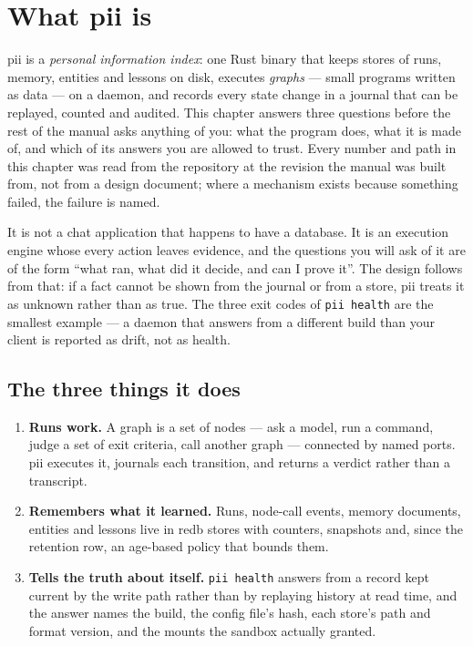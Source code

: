 \chapter{What pii is}

\label{ch:what}

pii is a \emph{personal information index}: one Rust binary that keeps stores of runs,
memory, entities and lessons on disk, executes \emph{graphs} --- small programs written as
data --- on a daemon, and records every state change in a journal that can be replayed,
counted and audited. This chapter answers three questions before the rest of the manual
asks anything of you: what the program does, what it is made of, and which of its answers
you are allowed to trust. Every number and path in this chapter was read from the
repository at the revision the manual was built from, not from a design document; where a
mechanism exists because something failed, the failure is named.

It is not a chat application that happens to have a database. It is an execution engine
whose every action leaves evidence, and the questions you will ask of it are of the form
\enquote{what ran, what did it decide, and can I prove it}. The design follows from that:
if a fact cannot be shown from the journal or from a store, pii treats it as unknown rather
than as true. The three exit codes of \texttt{pii health} are the smallest example --- a
daemon that answers from a different build than your client is reported as drift, not as
health.

\section{The three things it does}

\begin{enumerate}
	\item \textbf{Runs work.} A graph is a set of nodes --- ask a model, run a command,
	judge a set of exit criteria, call another graph --- connected by named ports. pii
	executes it, journals each transition, and returns a verdict rather than a transcript.
	\item \textbf{Remembers what it learned.} Runs, node-call events, memory documents,
	entities and lessons live in redb stores with counters, snapshots and, since the
	retention row, an age-based policy that bounds them.
	\item \textbf{Tells the truth about itself.} \texttt{pii health} answers from a record
	kept current by the write path rather than by replaying history at read time, and the
	answer names the build, the config file's hash, each store's path and format version,
	and the mounts the sandbox actually granted.
\end{enumerate}

